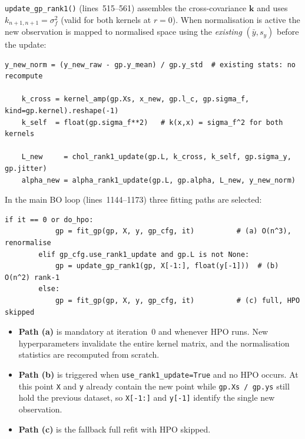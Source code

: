 \documentclass[11pt,a4paper]{article}
\theoremstyle{remark}
\newcommand{\coderange}[2]{lines~#1--#2}
\newcommand{\codefn}[1]{\texttt{#1()}}
\begin{document}
\codefn{update\_gp\_rank1} (\coderange{515}{561}) assembles the cross-covariance
$\bm{k}$ and uses $k_{n+1,n+1} = \sigma_f^2$ (valid for both kernels at $r=0$).
When normalisation is active the new observation is mapped to normalised space
using the \emph{existing} $(\bar{y}, s_y)$ before the update:

\begin{lstlisting}[firstnumber=539, caption=\codefn{update\_gp\_rank1}]
    y_new_norm = (y_new_raw - gp.y_mean) / gp.y_std  # existing stats: no recompute

    k_cross = kernel_amp(gp.Xs, x_new, gp.l_c, gp.sigma_f, kind=gp.kernel).reshape(-1)
    k_self  = float(gp.sigma_f**2)   # k(x,x) = sigma_f^2 for both kernels

    L_new     = chol_rank1_update(gp.L, k_cross, k_self, gp.sigma_y, gp.jitter)
    alpha_new = alpha_rank1_update(gp.L, gp.alpha, L_new, y_new_norm)
\end{lstlisting}

In the main BO loop (\coderange{1144}{1173}) three fitting paths are selected:

\begin{lstlisting}[firstnumber=1164, caption=Fitting path selection in \codefn{bayesian\_optimization}]
        if it == 0 or do_hpo:
            gp = fit_gp(gp, X, y, gp_cfg, it)          # (a) O(n^3), renormalise
        elif gp_cfg.use_rank1_update and gp.L is not None:
            gp = update_gp_rank1(gp, X[-1:], float(y[-1]))  # (b) O(n^2) rank-1
        else:
            gp = fit_gp(gp, X, y, gp_cfg, it)          # (c) full, HPO skipped
\end{lstlisting}

\begin{itemize}
  \item \textbf{Path (a)} is mandatory at iteration~0 and whenever HPO runs.
        New hyperparameters invalidate the entire kernel matrix, and the
        normalisation statistics are recomputed from scratch.
  \item \textbf{Path (b)} is triggered when \texttt{use\_rank1\_update=True}
        and no HPO occurs.  At this point \texttt{X} and \texttt{y} already
        contain the new point while \texttt{gp.Xs / gp.ys} still hold the
        previous dataset, so \texttt{X[-1:]} and \texttt{y[-1]} identify the
        single new observation.
  \item \textbf{Path (c)} is the fallback full refit with HPO skipped.
\end{itemize}
\end{document}
